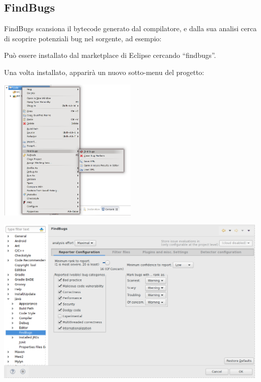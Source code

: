 \documentclass[presentation]{beamer}
\begin{document}
\subsection{FindBugs}

 {
   {
      FindBugs scansiona il bytecode generato dal compilatore, e dalla sua analisi cerca di scoprire potenziali bug nel sorgente, ad esempio:
  }
}

 {
	 {
		Può essere installato dal marketplace di Eclipse cercando ``findbugs''.
		
		Una volta installato, apparirà  un nuovo sotto-menu del progetto:
		
		\centering
		\includegraphics[width=0.5\textwidth]{img/findbugs}
	}
}

 {
	\centering
	\includegraphics[width=0.99\textwidth]{img/findbugsconf}
}
\end{document}
